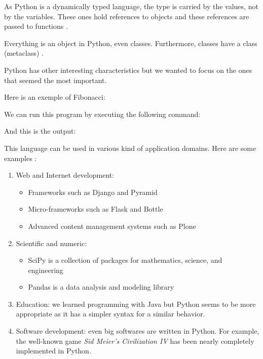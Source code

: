 As Python is a dynamically typed language, the type is carried by the values, not by the variables. These ones hold references to objects and these references are passed to functions \cite{wikipediaEN_python_syntax_semantics}.

Everything is an object in Python, even classes. Furthermore, classes have a class (metaclass) \cite{python_datamodel}.

Python has other interesting characteristics but we wanted to focus on the ones that seemed the most important.
\newline

Here is an exemple of Fibonacci:


We can run this program by executing the following command:


And this is the output:


This language can be used in various kind of application domains. Here are some examples \cite{python_applications}:
\begin{enumerate}
    \item {Web and Internet development:
        \begin{itemize}
            \item Frameworks such as Django and Pyramid
            \item Micro-frameworks such as Flask and Bottle
            \item Advanced content management systems such as Plone
        \end{itemize}
    }
    \item {Scientific and numeric:
        \begin{itemize}
            \item SciPy is a collection of packages for mathematics, science, and engineering
            \item Pandas is a data analysis and modeling library
        \end{itemize}
    
    }
    \item Education: we learned programming with Java but Python seems to be more appropriate as it has a simpler syntax for a similar behavior.
    \item Software development: even big softwares are written in Python. For example, the well-known game \emph{Sid Meier's Civilization IV} has been nearly completely implemented in Python.
\end{enumerate}

